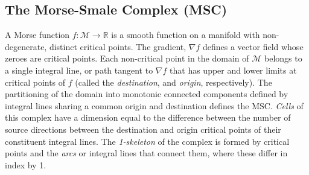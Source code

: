 \subsection{The Morse-Smale Complex (MSC)}
\label{ssec:msc}
A Morse function $f: \mathcal{M}\rightarrow \mathbb{R}$ is a smooth function on a manifold with non-degenerate, distinct critical points. The gradient, $\nabla f$ defines a vector field whose zeroes are critical points. %
Each non-critical point in the domain of $\mathcal{M}$ belongs to a single integral line, or path tangent to $\nabla f$ that has upper and lower limits at critical points of $f$ (called the \emph{destination}, and \emph{origin}, respectively). The partitioning of the domain into monotonic connected components defined by integral lines sharing a common origin and destination defines the MSC. \textit{Cells} of this complex have a dimension equal to the difference between the number of source directions between the destination and origin critical points of their constituent integral lines. %
The \textit{1-skeleton} of the complex is formed by critical points %
and the \emph{arcs} or integral lines that connect them, where these differ in index by 1. 
